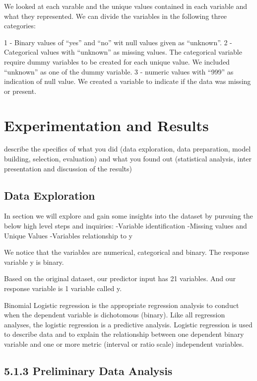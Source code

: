 \documentclass[english,floatsintext,man]{apa6}
\begin{document}
We looked at each varable and the unique values contained in each
variable and what they represented. We can divide the variables in the
following three categories:

1 - Binary values of \enquote{yes} and \enquote{no} wit null values
given as \enquote{unknown}. 2 - Categorical values with
\enquote{unknown} as missing values. The categorical variable require
dummy variables to be created for each unique value. We included
\enquote{unknown} as one of the dummy variable. 3 - numeric values with
\enquote{999} as indication of null value. We created a variable to
indicate if the data was missing or present.

\section{Experimentation and Results}\label{experimentation-and-results}

describe the specifics of what you did (data exploration, data
preparation, model building, selection, evaluation) and what you found
out (statistical analysis, inter presentation and discussion of the
results)

\subsection{Data Exploration}\label{data-exploration}

In section we will explore and gain some insights into the dataset by
pursuing the below high level steps and inquiries: -Variable
identification -Missing values and Unique Values -Variables relationship
to y

We notice that the variables are numerical, categorical and binary. The
response variable y is binary.

Based on the original dataset, our predictor input has 21 variables. And
our response variable is 1 variable called y.

Binomial Logistic regression is the appropriate regression analysis to
conduct when the dependent variable is dichotomous (binary). Like all
regression analyses, the logistic regression is a predictive analysis.
Logistic regression is used to describe data and to explain the
relationship between one dependent binary variable and one or more
metric (interval or ratio scale) independent variables.

\subsection{5.1.3 Preliminary Data
Analysis}\label{preliminary-data-analysis}
\end{document}
